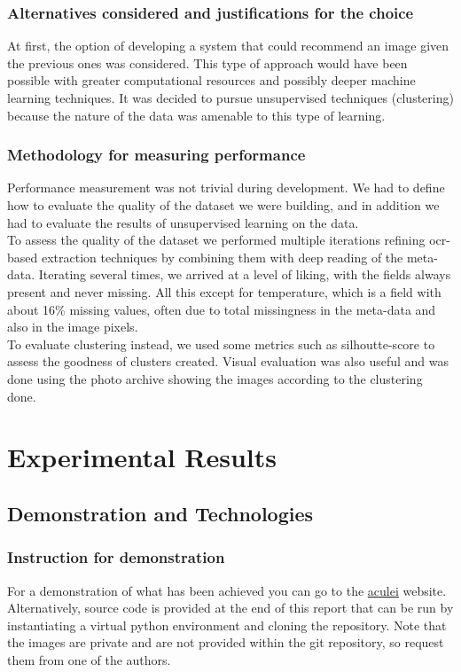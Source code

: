 \documentclass[12pt,a4paper,twoside]{article}
\begin{document}
\subsubsection{Alternatives considered and justifications for the choice}
At first, the option of developing a system that could recommend an image given the previous ones was considered. This type of approach would have been possible with greater computational resources and possibly deeper machine learning techniques. It was decided to pursue unsupervised techniques (clustering) because the nature of the data was amenable to this type of learning.  

\subsubsection{Methodology for measuring performance}
Performance measurement was not trivial during development. We had to define how to evaluate the quality of the dataset we were building, and in addition we had to evaluate the results of unsupervised learning on the data. \\ To assess the quality of the dataset we performed multiple iterations refining ocr-based extraction techniques by combining them with deep reading of the meta-data. Iterating several times, we arrived at a level of liking, with the fields always present and never missing. All this except for temperature, which is a field with about 16\% missing values, often due to total missingness in the meta-data and also in the image pixels. \\ To evaluate clustering instead, we used some metrics such as silhoutte-score to assess the goodness of clusters created. Visual evaluation was also useful and was done using the photo archive showing the images according to the clustering done.

\section{Experimental Results}

\subsection{Demonstration and Technologies}

\subsubsection{Instruction for demonstration}
For a demonstration of what has been achieved you can go to the \href{https://aculei.xyz}{aculei} website. Alternatively, source code is provided at the end of this report that can be run by instantiating a virtual python environment and cloning the repository. Note that the images are private and are not provided within the git repository, so request them from one of the authors.
\end{document}
